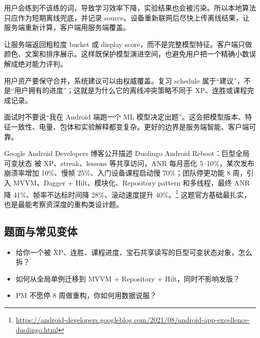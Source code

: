 \begin{followup}[“本地兜底算法与服务端模型长期偏离会有什么问题？”]
用户会练到不该练的词，导致学习效率下降，实验结果也会被污染。所以本地算法只应作为短期离线兜底，并记录 source。设备重新联网后尽快上传离线结果，让服务端重新计算，客户端用服务端覆盖。
\end{followup}

\begin{followup}[“如何不暴露模型细节又展示掌握度？”]
让服务端返回粗粒度 bucket 或 display score，而不是完整模型特征。客户端只做颜色、文案和排序展示。这样既保护模型演进空间，也避免用户把一个精确小数误解成绝对能力评判。
\end{followup}

\begin{idea}[资产与建议的同步策略不同]
用户资产要保守合并，系统建议可以由权威覆盖。复习 schedule 属于“建议”，不是“用户拥有的进度”；这就是为什么它的离线冲突策略不同于 XP、连胜或课程完成记录。
\end{idea}

\begin{pitfall}
面试时不要说“我在 Android 端跑一个 ML 模型决定出题”。这会把模型版本、特征一致性、电量、包体和实验解释都变复杂。更好的边界是服务端智能、客户端可靠。
\end{pitfall}


\srcofficial Google Android Developers 博客公开描述 Duolingo Android Reboot：巨型全局可变状态  被 XP、streak、lessons 等共享访问，ANR 每月恶化 5--10\%，某次发布崩溃率增加 10\%、慢帧 25\%、入门设备课程启动慢 70\%；团队停更功能 8 周，引入 MVVM、Dagger + Hilt、模块化、Repository pattern 和多线程，最终 ANR 降 41\%、帧率不达标时间降 28\%、滚动速度提升 40\%。\footnote{\url{https://android-developers.googleblog.com/2021/08/android-app-excellence-duolingo.html}} 这题官方基础最扎实，也是最能考察资深度的重构类设计题。

\subsection{题面与常见变体}

\begin{itemize}
  \item 给你一个被 XP、连胜、课程进度、宝石共享读写的巨型可变状态对象，怎么拆？
  \item 如何从全局单例迁移到 MVVM + Repository + Hilt，同时不影响发版？
  \item PM 不愿停 8 周做重构，你如何用数据说服？
\end{itemize}

